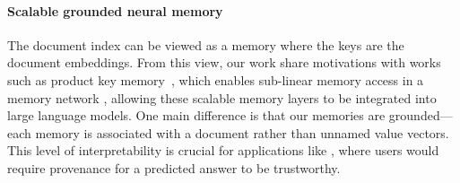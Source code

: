 \paragraph{Scalable grounded neural memory}
The document index can be viewed as a memory where the keys are the document embeddings.
From this view, our work share motivations
with works such as product key memory~\cite{product_key},
which enables
sub-linear memory access in a memory network \cite{memory_networks,neural_turing,end_to_end_memory}, allowing these scalable memory layers to be integrated into large language models.
One main difference is that our memories are grounded---each memory is associated with a document rather than unnamed value vectors. This level of interpretability is crucial for applications like \openqa, where users would require provenance for a predicted answer to be trustworthy.

